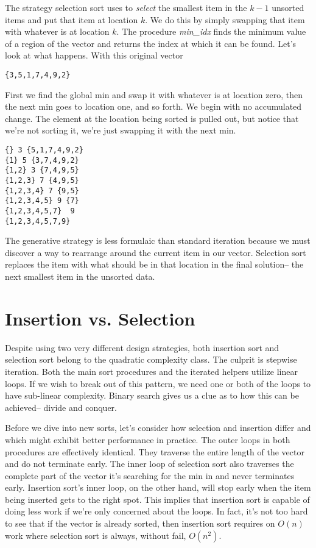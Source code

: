 \documentclass[]{tufte-handout}
\begin{document}
The strategy selection sort uses to \textit{select} the smallest item in the $k-1$ unsorted items and put that item at location $k$. We do this by simply swapping that item with whatever is at location $k$. The procedure \textit{min\_idx} finds the minimum value of a region of the vector and returns the index at which it can be found. Let's look at what happens. With this original vector
\begin{verbatim}
{3,5,1,7,4,9,2}
\end{verbatim}
First we find the global min and swap it with whatever is at location zero, then the next min goes to location one, and so forth. We begin with no accumulated change. The element at the location being sorted is pulled out, but notice that we're not sorting it, we're just swapping it with the next min.
\begin{verbatim}
{} 3 {5,1,7,4,9,2}
{1} 5 {3,7,4,9,2}
{1,2} 3 {7,4,9,5}
{1,2,3} 7 {4,9,5}
{1,2,3,4} 7 {9,5}
{1,2,3,4,5} 9 {7}
{1,2,3,4,5,7}  9
{1,2,3,4,5,7,9} 
\end{verbatim}

The generative strategy is less formulaic than standard iteration because we must discover a way to rearrange around the current item in our vector. Selection sort replaces the item with what should be in that location in the final solution-- the next smallest item in the unsorted data.  

\section{Insertion vs. Selection}

Despite using two very different design strategies, both insertion sort and selection sort belong to the quadratic complexity class. The culprit is stepwise iteration. Both the main sort procedures and the iterated helpers utilize linear loops. If we wish to break out of this pattern, we need one or both of the loops to have sub-linear complexity. Binary search gives us a clue as to how this can be achieved-- divide and conquer. 

Before we dive into new sorts, let's consider how selection and insertion differ and which might exhibit better performance in practice. The outer loops in both procedures are effectively identical. They traverse the entire length of the vector and do not terminate early. The inner loop of selection sort also traverses the complete part of the vector it's searching for the min in and never terminates early. Insertion sort's inner loop, on the other hand, will stop early when the item being inserted gets to the right spot. This implies that insertion sort is capable of doing less work if we're only concerned about the loops. In fact, it's not too hard to see that if the vector is already sorted, then insertion sort requires on $O(n)$ work where selection sort is always, without fail, $O(n^2)$. 
\end{document}

